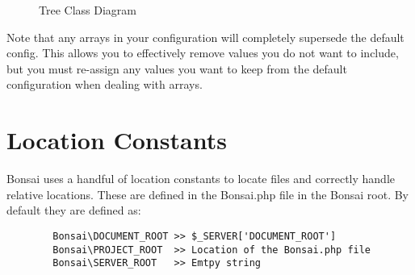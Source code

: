 \documentclass[]{book}
\begin{document}
\begin{figure}[H]
	\caption{Tree Class Diagram}
	\label{treeClassDiagram}	
	\vspace{12pt}
	\centering
	
	\vspace{12pt}
	
\end{figure}

Note that any arrays in your configuration will completely supersede the default config. This allows you to effectively remove values you do not want to include, but you must re-assign any values you want to keep from the default configuration when dealing with arrays.

\section{Location Constants}

Bonsai uses a handful of location constants to locate files and correctly handle relative locations. These are defined in the Bonsai.php file in the Bonsai root. By default they are defined as:

\begin{verbatim}
	    Bonsai\DOCUMENT_ROOT >> $_SERVER['DOCUMENT_ROOT']
	    Bonsai\PROJECT_ROOT  >> Location of the Bonsai.php file
	    Bonsai\SERVER_ROOT   >> Emtpy string
\end{verbatim}
\end{document}
